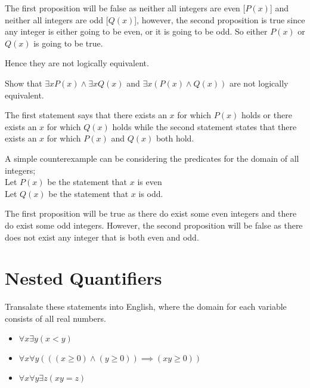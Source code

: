 \documentclass[addpoints]{exam}
\newenvironment{problem}[2][Problem]{\begin{trivlist}
    \item[\hskip \labelsep {\bfseries #1}\hskip \labelsep {\bfseries #2.}]}{\end{trivlist}}
\begin{document}
\begin{sloppypar}
\begin{questions}
\begin{solution}
        The first proposition will be false as neither all integers are even [$ P(x) $] and neither all integers are odd [$ Q(x) $], however, the second proposition is true since any integer is either going to be even, or it is going to be odd. So either $ P(x) $  or $ Q(x) $ is going to be true. 

        Hence they are not logically equivalent.
    \end{solution}
\end{questions}

\begin{problem}{13}
Show that  $\exists x P(x) \land \exists x Q(x)$ and $\exists x (P(x) \land Q(x))$ are not logically equivalent.
\end{problem}

\begin{questions}
    \question
    \begin{solution}

        The first statement says that there exists an $x$ for which $ P(x) $ holds or there exists an $x$ for which $ Q(x) $ holds while the second statement states that there exists an $x$ for which $ P(x) $ and $ Q(x) $ both hold. 

        A simple counterexample can be considering the predicates for the domain of all integers; \\ Let $ P(x) $ be the statement that $x$ is even \\ Let $ Q(x) $ be the statement that $x$ is odd. 

        The first proposition will be true as there do exist some even integers and there do exist some odd integers. However, the second proposition will be false as there does not exist any integer that is both even and odd.
    \end{solution}
\end{questions}
\pagebreak
\section*{Nested Quantifiers}
\begin{problem}{14}
Transalate these statements into English, where the domain for each variable consists of all real numbers.
\begin{itemize}
    \item[(a)] $\forall x \exists y (x < y) $
    \item[(b)] $\forall x \forall y (((x \geq 0) \land (y \geq 0) ) \implies (xy \geq 0)) $
    \item[(c)] $\forall x \forall y \exists z (xy=z) $
\end{itemize}
\end{problem}


\end{sloppypar}
\end{document}
